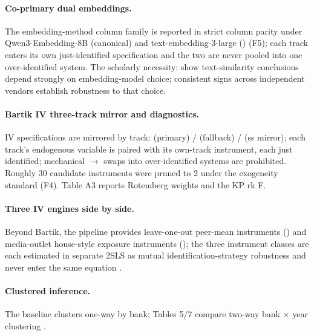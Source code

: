 \paragraph{Co-primary dual embeddings.}
The embedding-method column family is reported in strict column
parity under Qwen3-Embedding-8B (canonical) and
text-embedding-3-large () (F5); each track enters its own
just-identified specification and the two are never pooled into one
over-identified system. The scholarly necessity:
\textcite{ganguli2024patenttext} show text-similarity conclusions
depend strongly on embedding-model choice; consistent signs across
independent vendors establish robustness to that choice.

\paragraph{Bartik IV three-track mirror and diagnostics.}
IV specifications are mirrored by track:
 (primary) / 
(fallback) /  (ss mirror); each track's
endogenous variable is paired with its own-track instrument, each
just identified; mechanical $\to$ swaps into
over-identified systems are prohibited. Roughly 30 candidate
instruments were pruned to 2 under the
\textcite{goldsmith2020bartik} exogeneity standard (F4). Table A3
reports Rotemberg weights and the KP rk F.

\paragraph{Three IV engines side by side.}
Beyond Bartik, the pipeline provides leave-one-out peer-mean
instruments () and media-outlet
house-style exposure instruments (); the three
instrument classes are each estimated in separate 2SLS as mutual
identification-strategy robustness and never enter the same equation
\parencite{borusyak2025shiftshareguide}.

\paragraph{Clustered inference.}
The baseline clusters one-way by bank; Tables 5/7 compare two-way
bank $\times$ year clustering \parencite{cameron2015practitioner}.


